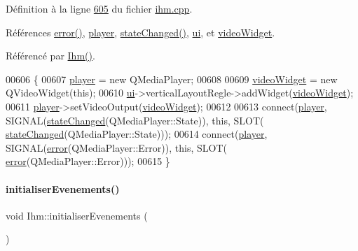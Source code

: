 Définition à la ligne \hyperlink{ihm_8cpp_source_l00605}{605} du fichier \hyperlink{ihm_8cpp_source}{ihm.\+cpp}.



Références \hyperlink{ihm_8cpp_source_l00690}{error()}, \hyperlink{ihm_8h_source_l00064}{player}, \hyperlink{ihm_8cpp_source_l00675}{state\+Changed()}, \hyperlink{ihm_8h_source_l00052}{ui}, et \hyperlink{ihm_8h_source_l00065}{video\+Widget}.



Référencé par \hyperlink{ihm_8cpp_source_l00026}{Ihm()}.


\begin{DoxyCode}
00606 \{
00607     \hyperlink{class_ihm_a633230fb15d587e647ad9d2d6142ebc3}{player} = \textcolor{keyword}{new} QMediaPlayer;
00608 
00609     \hyperlink{class_ihm_a011827612654af9b19bc8c42045e3c06}{videoWidget} = \textcolor{keyword}{new} QVideoWidget(\textcolor{keyword}{this});
00610     \hyperlink{class_ihm_a0ac5f47856566ceeeca1720109bf70ea}{ui}->verticalLayoutRegle->addWidget(\hyperlink{class_ihm_a011827612654af9b19bc8c42045e3c06}{videoWidget});
00611     \hyperlink{class_ihm_a633230fb15d587e647ad9d2d6142ebc3}{player}->setVideoOutput(\hyperlink{class_ihm_a011827612654af9b19bc8c42045e3c06}{videoWidget});
00612 
00613     connect(\hyperlink{class_ihm_a633230fb15d587e647ad9d2d6142ebc3}{player}, SIGNAL(\hyperlink{class_ihm_a3c815827527ca8f9c586e001e8e95721}{stateChanged}(QMediaPlayer::State)), \textcolor{keyword}{this}, SLOT(
      \hyperlink{class_ihm_a3c815827527ca8f9c586e001e8e95721}{stateChanged}(QMediaPlayer::State)));
00614     connect(\hyperlink{class_ihm_a633230fb15d587e647ad9d2d6142ebc3}{player}, SIGNAL(\hyperlink{class_ihm_a28b5dd043c4d752bb944110d8d8457aa}{error}(QMediaPlayer::Error)), \textcolor{keyword}{this}, SLOT(
      \hyperlink{class_ihm_a28b5dd043c4d752bb944110d8d8457aa}{error}(QMediaPlayer::Error)));
00615 \}
\end{DoxyCode}
\mbox{\label{class_ihm_a9df8990148a898f728304a4e789be2a6}} 
\paragraph{\texorpdfstring{initialiser\+Evenements()}{initialiserEvenements()}}
{\footnotesize\ttfamily void Ihm\+::initialiser\+Evenements (\begin{DoxyParamCaption}{ }\end{DoxyParamCaption})\hspace{0.3cm}{\ttfamily [private]}}



